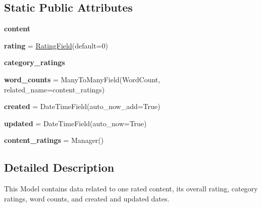 \subsection*{Static Public Attributes}
\begin{DoxyCompactItemize}
\item 
{\bfseries content}
\item 
\mbox{\label{classcapstoneproject_1_1models_1_1models_1_1content__rating_1_1_content_rating_ac0d1570fda3a7a30a566587b8f791df3}} 
{\bfseries rating} = \mbox{\hyperlink{classcapstoneproject_1_1models_1_1fields_1_1rating__field_1_1_rating_field}{Rating\+Field}}(default=0)
\item 
{\bfseries category\+\_\+ratings}
\item 
\mbox{\label{classcapstoneproject_1_1models_1_1models_1_1content__rating_1_1_content_rating_a7b722d9c1409540415af57f53ef33626}} 
{\bfseries word\+\_\+counts} = Many\+To\+Many\+Field(Word\+Count, related\+\_\+name=\textquotesingle{}content\+\_\+ratings\textquotesingle{})
\item 
\mbox{\label{classcapstoneproject_1_1models_1_1models_1_1content__rating_1_1_content_rating_ae7495529d275dd1d30db23609d527f5f}} 
{\bfseries created} = Date\+Time\+Field(auto\+\_\+now\+\_\+add=True)
\item 
\mbox{\label{classcapstoneproject_1_1models_1_1models_1_1content__rating_1_1_content_rating_abd74e4d4b7338b52bafcae8eec461de2}} 
{\bfseries updated} = Date\+Time\+Field(auto\+\_\+now=True)
\item 
\mbox{\label{classcapstoneproject_1_1models_1_1models_1_1content__rating_1_1_content_rating_a47b03ebc053ae48c29a43bada1502fb8}} 
{\bfseries content\+\_\+ratings} = Manager()
\end{DoxyCompactItemize}


\subsection{Detailed Description}
\begin{DoxyVerb}This Model contains data related to one rated content,
its overall rating, category ratings, word counts,
and created and updated dates.
\end{DoxyVerb}
 

